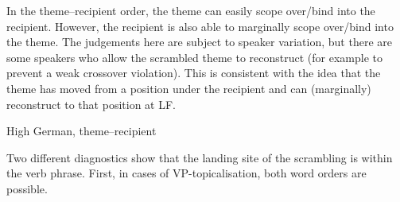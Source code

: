 \documentclass[11pt]{upenndiss}
\begin{document}
\begin{exe}
	\ex 
\begin{xlist}
\end{xlist}
\end{exe}

In the theme--recipient order, the theme can easily scope over/bind into the recipient. However, the recipient is also able to marginally scope over/bind into the theme. The judgements here are subject to speaker variation, but there are some speakers who allow the scrambled theme to reconstruct (for example to prevent a weak crossover violation). This is consistent with the idea that the theme has moved from a position under the recipient and can (marginally) reconstruct to that position at LF.

\begin{exe}
	\ex High German, theme--recipient 
\begin{xlist}
\end{xlist}
\end{exe}

Two different diagnostics show that the landing site of the scrambling is within the verb phrase. First, in cases of VP-topicalisation, both word orders are possible.
\end{document}
